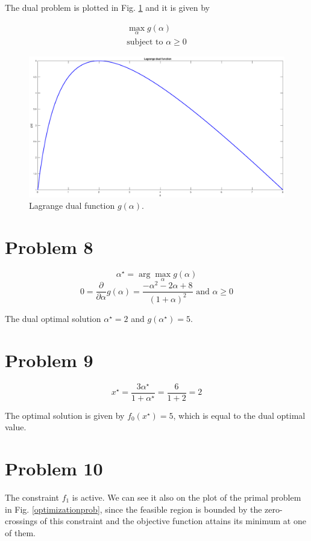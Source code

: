 \documentclass[12pt]{article}
\begin{document}
The dual problem is plotted in Fig. \ref{fig:dual} and it is given by

\begin{equation}
 \begin{align}
  \max_\alpha g(\alpha) \\
  \text{subject to } \alpha \geq 0
 \end{align}
\end{equation}


\begin{figure}[!ht] 
 \center
 \includegraphics[width=\textwidth]{prob7}
 \caption{Lagrange dual function $g(\alpha)$.}
 \label{fig:dual}
\end{figure}

\section*{Problem 8}

\begin{equation}
 \alpha^\star = \arg \max_\alpha g(\alpha) 
\end{equation}
\begin{equation}
 0 = \frac{\partial}{\partial \alpha} g(\alpha) = \frac{- \alpha^2 - 2 \alpha +8}{(1 + \alpha)^2} \text{ and } \alpha \geq 0
\end{equation}

The dual optimal solution $\alpha^\star = 2$ and $g(\alpha^\star) = 5$.

\section*{Problem 9}

\begin{equation}
 x^\star = \frac{3 \alpha^\star}{1 + \alpha^\star} = \frac{6}{1 + 2} = 2
\end{equation}

The optimal solution is given by $f_0(x^\star) = 5$, which is equal to the dual optimal value.

\section*{Problem 10}

The constraint $f_1$ is active. We can see it also on the plot of the primal problem in Fig. \ref{optimizationprob}, since the feasible region is bounded by the zero-crossings of this constraint and the objective function attains its minimum at one of them.

  
\end{document}
